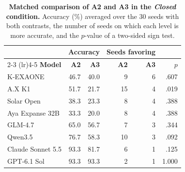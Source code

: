 \begin{table}[t]
\centering
\small
\setlength{\tabcolsep}{4pt}
\caption{\textbf{Matched comparison of A2 and A3 in the \textit{Closed} condition.}
Accuracy (\%) averaged over the 30 seeds with both contrasts, the number of seeds on which each level is more accurate, and the $p$-value of a two-sided sign test.}
\label{tab:matched_test}
\begin{tabular}{@{}lrrrrr@{}}
\toprule
 & \multicolumn{2}{c}{\textbf{Accuracy}} & \multicolumn{2}{c}{\textbf{Seeds favoring}} & \\
\cmidrule(lr){2-3} \cmidrule(lr){4-5}
\textbf{Model} & \textbf{A2} & \textbf{A3} & \textbf{A2} & \textbf{A3} & $p$ \\
\midrule
K-EXAONE          & 46.7 & 40.0 & 9  & 6 & .607 \\
A.X K1            & 51.7 & 21.7 & 15 & 4 & .019 \\
Solar Open        & 38.3 & 23.3 & 8  & 4 & .388 \\
\midrule
Aya Expanse 32B   & 33.3 & 20.0 & 8  & 4 & .388 \\
\midrule
GLM-4.7           & 65.0 & 56.7 & 7  & 3 & .344 \\
Qwen3.5           & 76.7 & 58.3 & 10 & 3 & .092 \\
\midrule
Claude Sonnet 5.5 & 93.3 & 81.7 & 6  & 1 & .125 \\
GPT-6.1 Sol       & 93.3 & 93.3 & 2  & 1 & 1.000 \\
\bottomrule
\end{tabular}
\end{table}